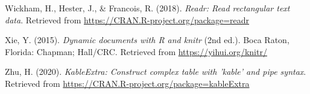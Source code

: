 \documentclass[
  english,
  man, fleqn, noextraspace]{apa6}
\begin{document}
\leavevmode\hypertarget{ref-R-readr}{}%
Wickham, H., Hester, J., \& Francois, R. (2018). \emph{Readr: Read rectangular text data}. Retrieved from \url{https://CRAN.R-project.org/package=readr}

\leavevmode\hypertarget{ref-R-knitr}{}%
Xie, Y. (2015). \emph{Dynamic documents with R and knitr} (2nd ed.). Boca Raton, Florida: Chapman; Hall/CRC. Retrieved from \url{https://yihui.org/knitr/}

\leavevmode\hypertarget{ref-R-kableExtra}{}%
Zhu, H. (2020). \emph{KableExtra: Construct complex table with 'kable' and pipe syntax}. Retrieved from \url{https://CRAN.R-project.org/package=kableExtra}

\endgroup
\end{document}
